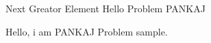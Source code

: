 \begin{problem}{Next Greator Element}
    Hello Problem PANKAJ
\end{problem}

Hello, i am PANKAJ Problem sample.